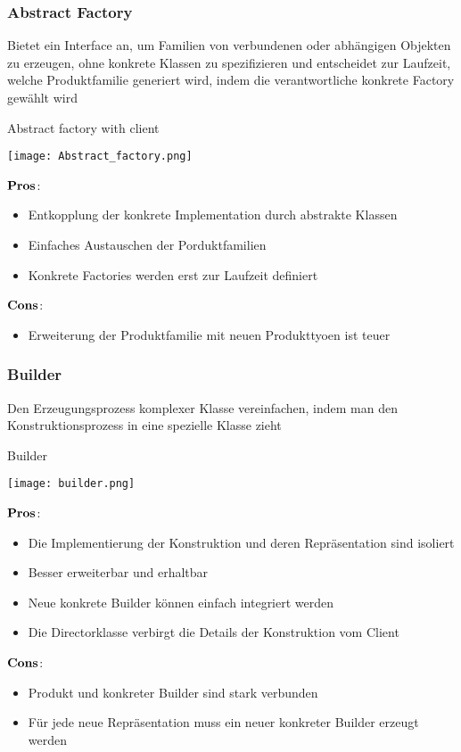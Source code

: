 \subsubsection{Abstract Factory}
Bietet ein Interface an, um Familien von verbundenen oder abhängigen Objekten zu erzeugen, ohne konkrete Klassen zu spezifizieren und entscheidet zur Laufzeit, welche Produktfamilie generiert wird, indem die verantwortliche konkrete Factory gewählt wird
\begin{table}[H]
\caption{Abstract factory with client}
\texttt{[image: Abstract\_factory.png]}
\end{table}
\begin{multicols}{2}
$\bold{Pros}$:
\begin{itemize}
	\item Entkopplung der konkrete Implementation durch abstrakte Klassen
	\item Einfaches Austauschen der Porduktfamilien
	\item Konkrete Factories werden erst zur Laufzeit definiert
\end{itemize}
\columnbreak
$\bold{Cons}$:
\begin{itemize}
	\item Erweiterung der Produktfamilie mit neuen Produkttyoen ist teuer
\end{itemize}
\end{multicols}
\subsubsection{Builder}
Den Erzeugungsprozess komplexer Klasse vereinfachen, indem man den Konstruktionsprozess in eine spezielle Klasse zieht
\begin{table}[H]
\caption{Builder}
\texttt{[image: builder.png]}
\end{table}
\begin{multicols}{2}
$\bold{Pros}$:
\begin{itemize}
	\item Die Implementierung der Konstruktion und deren Repräsentation sind isoliert
	\item Besser erweiterbar und erhaltbar
	\item Neue konkrete Builder können einfach integriert werden
	\item Die Directorklasse verbirgt die Details der Konstruktion vom Client 
\end{itemize}	
\columnbreak
$\bold{Cons}$:
\begin{itemize}
	\item Produkt und konkreter Builder sind stark verbunden
	\item Für jede neue Repräsentation muss ein neuer konkreter Builder erzeugt werden
\end{itemize}
\end{multicols}
